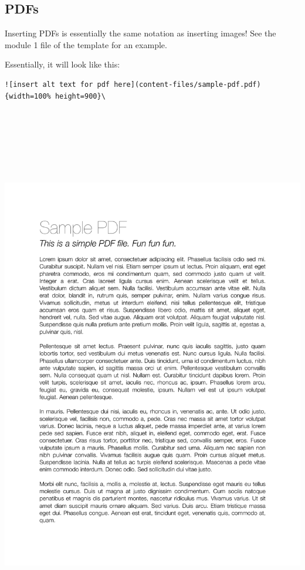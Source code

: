 \documentclass[
]{book}
\theoremstyle{definition}
\theoremstyle{definition}
\theoremstyle{definition}
\theoremstyle{definition}
\theoremstyle{remark}
\begin{document}
\subsection*{PDFs}\label{pdfs}

Inserting PDFs is essentially the same notation as inserting images! See the module 1 file of the template for an example.

Essentially, it will look like this:

\begin{verbatim}
![insert alt text for pdf here](content-files/sample-pdf.pdf){width=100% height=900}\
\end{verbatim}

\includegraphics[width=1\textwidth,height=9.375in]{content-files/sample-pdf.pdf}\\
\end{document}
